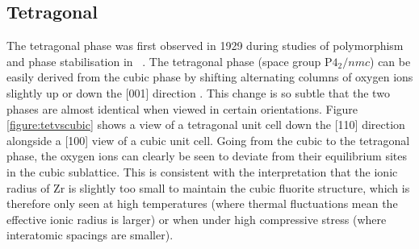 
\subsection{Tetragonal}

The tetragonal phase was first observed in 1929 during studies of polymorphism and phase stabilisation in \zirconia\ \cite{ruff1929refractory}. The tetragonal phase (space group P$4_{2}/nmc$) can be easily derived from the cubic phase by shifting alternating columns of oxygen ions slightly up or down the [001] direction \cite{teufer1962crystal}. This change is so subtle that the two phases are almost identical when viewed in certain orientations. Figure \ref{figure:tetvscubic} shows a view of a tetragonal unit cell down the [110] direction alongside a [100] view of a cubic unit cell. Going from the cubic to the tetragonal phase, the oxygen ions can clearly be seen to deviate from their equilibrium sites in the cubic sublattice. This is consistent with the interpretation that the ionic radius of Zr is slightly too small to maintain the cubic fluorite structure, which is therefore only seen at high temperatures (where thermal fluctuations mean the effective ionic radius is larger) or when under high compressive stress (where interatomic spacings are smaller).

